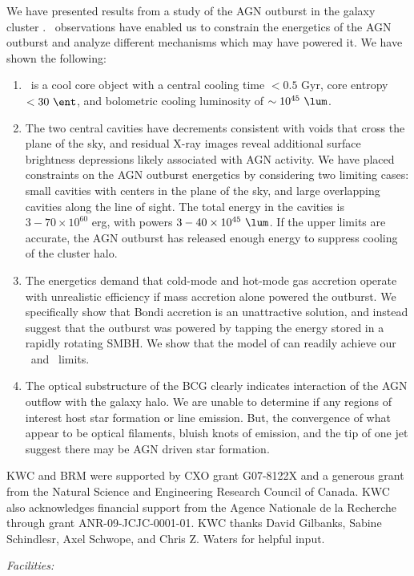 \documentclass[11pt, preprint]{aastex}
\begin{document}
We have presented results from a study of the AGN outburst in the
galaxy cluster \rbs. \cxo\ observations have enabled us to constrain
the energetics of the AGN outburst and analyze different mechanisms
which may have powered it. We have shown the following:
\begin{enumerate}
\item \rbs\ is a cool core object with a central cooling time $< 0.5$
  Gyr, core entropy $< 30 ~\ent$, and bolometric cooling luminosity of
  $\sim 10^{45} ~\lum$.
\item The two central cavities have decrements consistent with voids
  that cross the plane of the sky, and residual X-ray images reveal
  additional surface brightness depressions likely associated with AGN
  activity. We have placed constraints on the AGN outburst energetics
  by considering two limiting cases: small cavities with centers in
  the plane of the sky, and large overlapping cavities along the line
  of sight. The total energy in the cavities is $3-70 \times 10^{60}$
  erg, with powers $3-40 \times 10^{45} ~\lum$. If the upper limits
  are accurate, the AGN outburst has released enough energy to
  suppress cooling of the cluster halo.
\item The energetics demand that cold-mode and hot-mode gas accretion
  operate with unrealistic efficiency if mass accretion alone powered
  the outburst. We specifically show that Bondi accretion is an
  unattractive solution, and instead suggest that the outburst was
  powered by tapping the energy stored in a rapidly rotating SMBH. We
  show that the model of \citet{gesspin} can readily achieve our
  \ecav\ and \pcav\ limits.
\item The optical substructure of the BCG clearly indicates
  interaction of the AGN outflow with the galaxy halo. We are unable
  to determine if any regions of interest host star formation or line
  emission. But, the convergence of what appear to be optical
  filaments, bluish knots of emission, and the tip of one jet suggest
  there may be AGN driven star formation.
\end{enumerate}

\acknowledgements

KWC and BRM were supported by CXO grant G07-8122X and a generous grant
from the Natural Science and Engineering Research Council of
Canada. KWC also acknowledges financial support from the Agence
Nationale de la Recherche through grant ANR-09-JCJC-0001-01. KWC
thanks David Gilbanks, Sabine Schindlesr, Axel Schwope, and Chris
Z. Waters for helpful input.


{\it Facilities:}  
 





\clearpage





\end{document}
